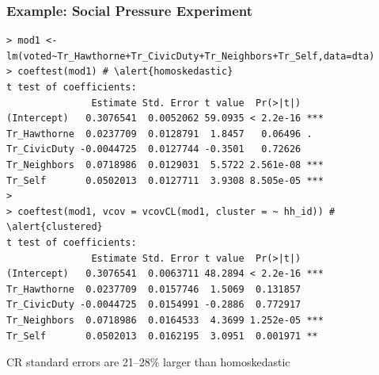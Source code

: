 \documentclass[xcolor=svgnames,9pt,english,aspectratio=169,t]{beamer}
\begin{document}
\begin{frame}[fragile]
\frametitle{Example: Social Pressure Experiment}
\small
\begin{Verbatim}[fontsize=\scriptsize, frame=single, label=R Code, commandchars=\\\{\}]
> mod1 <- lm(voted~Tr_Hawthorne+Tr_CivicDuty+Tr_Neighbors+Tr_Self,data=dta)
> coeftest(mod1) # \alert{homoskedastic}
t test of coefficients:
               Estimate Std. Error t value  Pr(>|t|)
(Intercept)   0.3076541  0.0052062 59.0935 < 2.2e-16 ***
Tr_Hawthorne  0.0237709  0.0128791  1.8457   0.06496 .
Tr_CivicDuty -0.0044725  0.0127744 -0.3501   0.72626
Tr_Neighbors  0.0718986  0.0129031  5.5722 2.561e-08 ***
Tr_Self       0.0502013  0.0127711  3.9308 8.505e-05 ***
>
> coeftest(mod1, vcov = vcovCL(mod1, cluster = ~ hh_id)) # \alert{clustered}
t test of coefficients:
               Estimate Std. Error t value  Pr(>|t|)
(Intercept)   0.3076541  0.0063711 48.2894 < 2.2e-16 ***
Tr_Hawthorne  0.0237709  0.0157746  1.5069  0.131857
Tr_CivicDuty -0.0044725  0.0154991 -0.2886  0.772917
Tr_Neighbors  0.0718986  0.0164533  4.3699 1.252e-05 ***
Tr_Self       0.0502013  0.0162195  3.0951  0.001971 **
\end{Verbatim}
CR standard errors are 21--28\% larger than homoskedastic
\end{frame}
\end{document}
